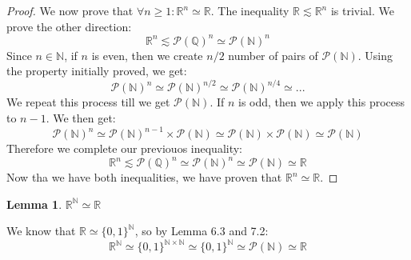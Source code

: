 \documentclass{article}
\newtheorem{lem}{Lemma}[section]
\begin{document}
\begin{proof}
We now prove that $\forall n \geqslant 1: \mathbb{R}^n \simeq \mathbb{R}$. The inequality $\mathbb{R} \lesssim \mathbb{R}^n$ is trivial. We prove the other direction:
\begin{equation*}
    \mathbb{R}^n \lesssim \mathcal{P}(\mathbb{Q})^n \simeq \mathcal{P}(\mathbb{N})^n
\end{equation*}
Since $n \in \mathbb{N}$, if $n$ is even, then we create $n/2$ number of pairs of $\mathcal{P}(\mathbb{N})$. Using the property initially proved, we get:
\begin{equation*}
    \mathcal{P}(\mathbb{N})^n \simeq \mathcal{P}(\mathbb{N})^{n/2} \simeq \mathcal{P}(\mathbb{N})^{n/4} \simeq...
\end{equation*}
We repeat this process till we get $\mathcal{P}(\mathbb{N})$. If $n$ is odd, then we apply this process to $n-1$. We then get:
\begin{equation*}
    \mathcal{P}(\mathbb{N})^n \simeq \mathcal{P}(\mathbb{N})^{n-1} \times \mathcal{P}(\mathbb{N}) \simeq \mathcal{P}(\mathbb{N}) \times \mathcal{P}(\mathbb{N}) \simeq \mathcal{P}(\mathbb{N})
\end{equation*}
Therefore we complete our previouos inequality:
\begin{equation*}
    \mathbb{R}^n \lesssim \mathcal{P}(\mathbb{Q})^n \simeq \mathcal{P}(\mathbb{N})^n \simeq \mathcal{P}(\mathbb{N}) \simeq \mathbb{R}
\end{equation*}
Now tha we have both inequalities, we have proven that $\mathbb{R}^n \simeq \mathbb{R}$.
\end{proof}

\vspace{6pt}

\begin{lem}
$\mathbb{R}^\mathbb{N} \simeq \mathbb{R}$
\end{lem}
We know that $\mathbb{R} \simeq \{0, 1\}^\mathbb{N}$, so by Lemma 6.3 and 7.2:
\begin{equation*}
    \mathbb{R}^\mathbb{N} \simeq \{0, 1\}^{\mathbb{N} \times \mathbb{N}} \simeq \{0, 1\}^{\mathbb{N}} \simeq \mathcal{P}(\mathbb{N}) \simeq \mathbb{R}
\end{equation*}

\vspace{6pt}
\end{document}

